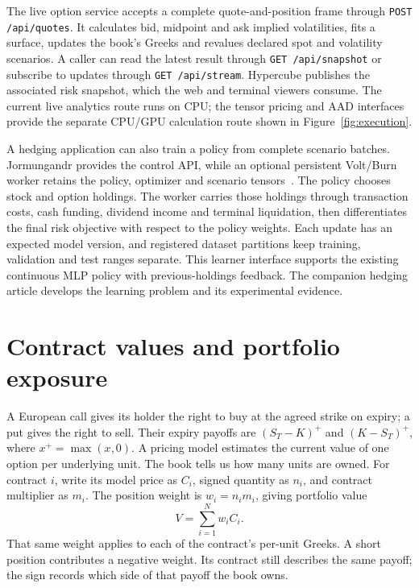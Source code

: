 \documentclass[8pt]{strategynet-journal}
\begin{document}
\begin{SNcolumns}
The live option service accepts a complete quote-and-position frame through
\texttt{POST /api/quotes}. It calculates bid, midpoint and ask implied
volatilities, fits a surface, updates the book's Greeks and revalues declared
spot and volatility scenarios. A caller can read the latest result through
\texttt{GET /api/snapshot} or subscribe to updates through
\texttt{GET /api/stream}. Hypercube publishes the associated risk snapshot,
which the web and terminal viewers consume. The current live analytics route
runs on CPU; the tensor pricing and AAD interfaces provide the separate
CPU/GPU calculation route shown in Figure~\ref{fig:execution}.

A hedging application can also train a policy from complete scenario batches.
Jormungandr provides the control API, while an optional persistent Volt/Burn
worker retains the policy, optimizer and scenario tensors~\cite{jormungandr}.
The policy chooses stock and option holdings. The worker carries those
holdings through transaction costs, cash funding, dividend income and terminal
liquidation, then differentiates the final risk objective with respect to the
policy weights. Each update has an expected model version, and registered
dataset partitions keep training, validation and test ranges separate.
This learner interface supports the existing continuous MLP policy with
previous-holdings feedback. The companion hedging article develops the
learning problem and its experimental evidence.

\section{Contract values and portfolio exposure}
A European call gives its holder the right to buy at the agreed strike on
expiry; a put gives the right to sell. Their expiry payoffs are $(S_T-K)^+$
and $(K-S_T)^+$, where $x^+=\max(x,0)$. A pricing model estimates the current
value of one option per underlying unit. The
book tells us how many units are owned. For contract $i$, write its model
price as $C_i$, signed quantity as $n_i$, and contract multiplier as $m_i$.
The position weight is $w_i=n_i m_i$, giving portfolio value
\begin{equation}
 V=\sum_{i=1}^{N} w_i C_i.\label{eq:portfolio}
\end{equation}
That same weight applies to each of the contract's per-unit Greeks. A short
position contributes a negative weight. Its contract still describes the same
payoff; the sign records which side of that payoff the book owns.


\end{SNcolumns}
\end{document}
